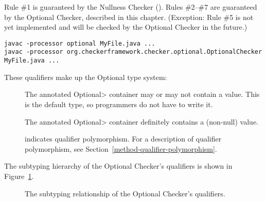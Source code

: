Rule \#1 is guaranteed by the Nullness Checker
().
Rules \#2--\#7 are guaranteed by the Optional Checker, described in this chapter.
(Exception:  Rule \#5 is not yet implemented and will be checked by the
Optional Checker in the future.)



\begin{Verbatim}
javac -processor optional MyFile.java ...
javac -processor org.checkerframework.checker.optional.OptionalChecker MyFile.java ...
\end{Verbatim}



These qualifiers make up the Optional type system:

\begin{description}

\item[]
  The annotated \<Optional> container may or may not contain a value.
  This is the default type, so programmers do not have to write it.

\item[]
  The annotated \<Optional> container definitely contains a (non-null) value.

\item[]
  indicates qualifier polymorphism.
  For a description of qualifier polymorphism, see
  Section~\ref{method-qualifier-polymorphism}.

\end{description}

The subtyping hierarchy of the Optional Checker's qualifiers is shown in
Figure~\ref{fig-optional-hierarchy}.

\begin{figure}
\caption{The subtyping relationship of the Optional Checker's qualifiers.}
\label{fig-optional-hierarchy}
\end{figure}


